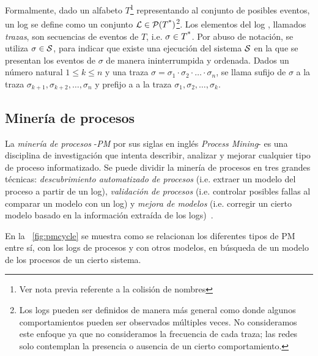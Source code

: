 Formalmente, dado un alfabeto $T$\footnote{Ver nota previa referente a la colisión de nombres} representando
al conjunto de posibles eventos, un log se define como un conjunto ${\mathcal L} \in \mathcal{P}(T\textsuperscript{*})$\footnote{
Los logs pueden ser definidos de manera más general como  donde algunos comportamientos
pueden ser observados múltiples veces. No consideramos este enfoque ya que no consideramos 
la frecuencia de cada traza; las redes solo contemplan la presencia o ausencia de un cierto comportamiento.}. 
Los elementos del log \pmlog, llamados \textit{trazas}, son secuencias de eventos de $T$,
i.e. $\sigma \in T\textsuperscript{*}$. 
Por abuso de notación, se utiliza $\sigma \in \mathcal{S}$, para indicar que existe una ejecución del sistema $\mathcal{S}$
en la que se presentan los eventos de $\sigma$ de manera ininterrumpida y ordenada.
Dados un número natural $1 \leq k \leq n$ y una traza $\sigma=\sigma_1\cdot\sigma_2\cdot\ldots\cdot\sigma_n$, 
se llama sufijo de $\sigma$  a la traza $\sigma_{k+1},\sigma_{k+2},\dots,\sigma_n$
y  prefijo a a la traza $\sigma_1,\sigma_2,\dots,\sigma_k$.


\subsection{Minería de procesos} 
\label{sec:2.process mining subsection}

La \textit{minería de procesos} -\textit{PM} por sus siglas en inglés \textit{Process Mining}-
es una disciplina de investigación que intenta describir, analizar y mejorar cualquier
tipo de proceso informatizado. Se puede dividir la minería de procesos en tres grandes técnicas: \textit{descubrimiento automatizado
de procesos} (i.e. extraer un modelo del proceso a partir de un log), \textit{validación de procesos} (i.e. controlar posibles fallas 
al comparar un modelo con un log) y \textit{mejora de modelos} (i.e. corregir un cierto modelo basado en la información extraída de los logs)~\cite{Aalst2004,AalstBook,FahlandA15}.

En la ~\autoref{fig:pmcycle} se muestra como se relacionan los diferentes tipos de PM entre sí, con los logs de procesos
y con otros modelos, en búsqueda de un modelo de los procesos de un cierto sistema.

